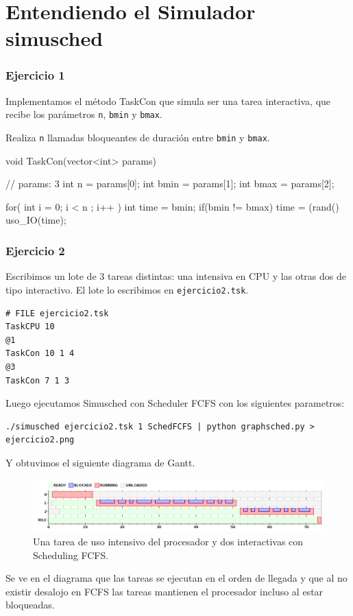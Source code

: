 


\part{Entendiendo el Simulador simusched}

\section{Ejercicio 1}

Implementamos el m\'etodo TaskCon que simula ser una tarea interactiva, que recibe los par\'ametros \verb|n|, \verb|bmin| y \verb|bmax|.

Realiza \verb|n| llamadas bloqueantes de duraci\'on entre \verb|bmin| y \verb|bmax|.

\begin{framed}
\begin{verbatimtab}
void TaskCon(vector<int> params) { // params: 3
	int n = params[0];
	int bmin = params[1];
	int bmax = params[2];
	
	for( int i = 0; i < n ; i++ ) {
		int time = bmin;
		if(bmin != bmax)
			time = (rand()%
		uso_IO(time);
	}
}
\end{verbatimtab}
\end{framed}

\section{Ejercicio 2}

Escribimos un lote de 3 tareas distintas: una intensiva en CPU y las otras dos de tipo interactivo. 
El lote lo escribimos en \verb|ejercicio2.tsk|.

\begin{framed}
\begin{verbatim}
# FILE ejercicio2.tsk
TaskCPU 10
@1
TaskCon 10 1 4
@3
TaskCon 7 1 3
\end{verbatim}
\end{framed}

Luego ejecutamos Simusched con Scheduler FCFS con los siguientes parametros:

\begin{verbatim}
./simusched ejercicio2.tsk 1 SchedFCFS | python graphsched.py > ejercicio2.png
\end{verbatim}

Y obtuvimos el siguiente diagrama de Gantt.

\begin{figure}[H]
  \centering
    \includegraphics[width=1\textwidth]{img/ejercicio2.png}
    \caption{Una tarea de uso intensivo del procesador y dos interactivas con Scheduling FCFS.}
\end{figure}

Se ve en el diagrama que las tareas se ejecutan en el orden de llegada y que al no existir desalojo en FCFS las tareas mantienen el procesador incluso al estar bloqueadas.

